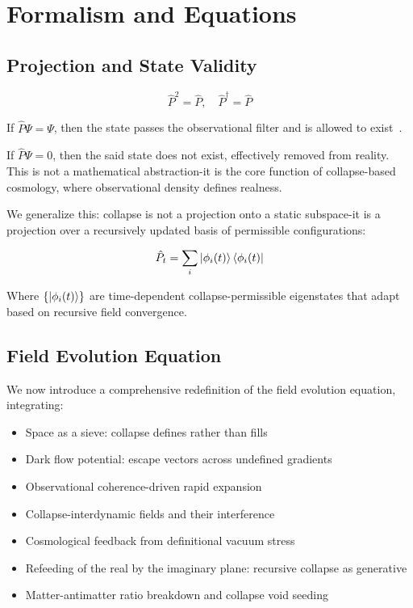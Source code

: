 \chapter{Formalism and Equations}
\renewcommand{\thesection}{10.\arabic{section}}

\section{Projection and State Validity}

\begin{equation}
\hat{P}^2 = \hat{P}, \quad \hat{P}^\dagger = \hat{P}
\end{equation}

If $\hat{P} \Psi = \Psi$, then the state passes the observational filter and is allowed to exist~\cite{wheeler_it_from_bit}.

If $\hat{P} \Psi = 0$, then the said state does not exist, effectively removed from reality. This is not a mathematical abstraction-it is the core function of collapse-based cosmology, where observational density defines realness.

We generalize this: collapse is not a projection onto a static subspace-it is a projection over a recursively updated basis of permissible configurations:

\begin{equation}
\hat{P}_t = \sum_i \ket{\phi_i(t)}\bra{\phi_i(t)}
\end{equation}

Where $\{\ket{\phi_i(t)}\}$ are time-dependent collapse-permissible eigenstates that adapt based on recursive field convergence.

\section{Field Evolution Equation}

We now introduce a comprehensive redefinition of the field evolution equation, integrating:
\begin{itemize}
  \item Space as a sieve: collapse defines rather than fills\cite{barbour_end_of_time}
  \item Dark flow potential: escape vectors across undefined gradients\cite{calzetta_hu_backreaction}
  \item Observational coherence-driven rapid expansion\cite{moffat_variable_c}
  \item Collapse-interdynamic fields and their interference\cite{pearle_collapse_quantized}
  \item Cosmological feedback from definitional vacuum stress\cite{penrose1996gravity}
  \item Refeeding of the real by the imaginary plane: recursive collapse as generative\cite{fewster_measurement_qft}
  \item Matter-antimatter ratio breakdown and collapse void seeding\cite{sakharov_1967}
\end{itemize}

